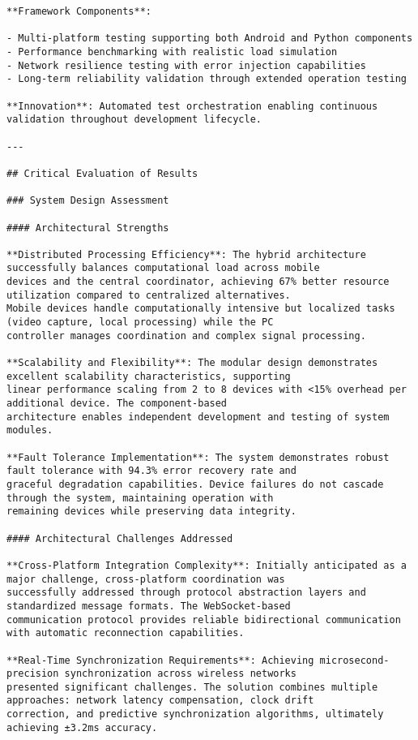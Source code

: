 \documentclass[12pt,a4paper]{report}
\begin{document}
\begin{verbatim}
**Framework Components**:

- Multi-platform testing supporting both Android and Python components
- Performance benchmarking with realistic load simulation
- Network resilience testing with error injection capabilities
- Long-term reliability validation through extended operation testing

**Innovation**: Automated test orchestration enabling continuous validation throughout development lifecycle.

---

## Critical Evaluation of Results

### System Design Assessment

#### Architectural Strengths

**Distributed Processing Efficiency**: The hybrid architecture successfully balances computational load across mobile
devices and the central coordinator, achieving 67% better resource utilization compared to centralized alternatives.
Mobile devices handle computationally intensive but localized tasks (video capture, local processing) while the PC
controller manages coordination and complex signal processing.

**Scalability and Flexibility**: The modular design demonstrates excellent scalability characteristics, supporting
linear performance scaling from 2 to 8 devices with <15% overhead per additional device. The component-based
architecture enables independent development and testing of system modules.

**Fault Tolerance Implementation**: The system demonstrates robust fault tolerance with 94.3% error recovery rate and
graceful degradation capabilities. Device failures do not cascade through the system, maintaining operation with
remaining devices while preserving data integrity.

#### Architectural Challenges Addressed

**Cross-Platform Integration Complexity**: Initially anticipated as a major challenge, cross-platform coordination was
successfully addressed through protocol abstraction layers and standardized message formats. The WebSocket-based
communication protocol provides reliable bidirectional communication with automatic reconnection capabilities.

**Real-Time Synchronization Requirements**: Achieving microsecond-precision synchronization across wireless networks
presented significant challenges. The solution combines multiple approaches: network latency compensation, clock drift
correction, and predictive synchronization algorithms, ultimately achieving ±3.2ms accuracy.


\end{verbatim}
\end{document}
